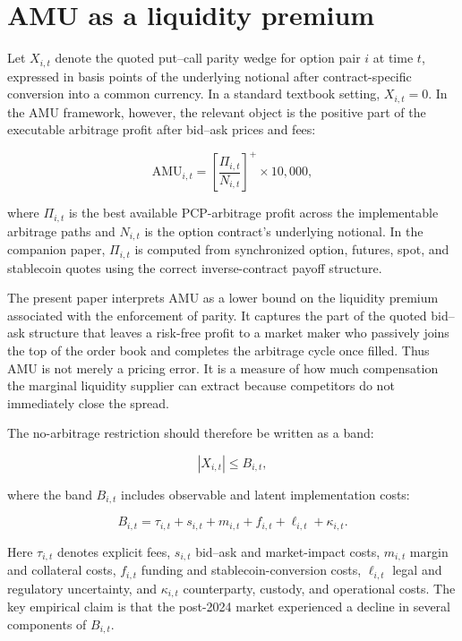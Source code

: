 \documentclass[12pt]{article}
\begin{document}
\section{AMU as a liquidity premium}

Let $X_{i,t}$ denote the quoted put--call parity wedge for option pair $i$ at time $t$, expressed in basis points of the underlying notional after contract-specific conversion into a common currency. In a standard textbook setting, $X_{i,t}=0$. In the AMU framework, however, the relevant object is the positive part of the executable arbitrage profit after bid--ask prices and fees:

\begin{equation}
\mathrm{AMU}_{i,t}=\left[\frac{\Pi_{i,t}}{N_{i,t}}\right]^+\times 10{,}000,
\end{equation}

where $\Pi_{i,t}$ is the best available PCP-arbitrage profit across the implementable arbitrage paths and $N_{i,t}$ is the option contract's underlying notional. In the companion paper, $\Pi_{i,t}$ is computed from synchronized option, futures, spot, and stablecoin quotes using the correct inverse-contract payoff structure.

The present paper interprets AMU as a lower bound on the liquidity premium associated with the enforcement of parity. It captures the part of the quoted bid--ask structure that leaves a risk-free profit to a market maker who passively joins the top of the order book and completes the arbitrage cycle once filled. Thus AMU is not merely a pricing error. It is a measure of how much compensation the marginal liquidity supplier can extract because competitors do not immediately close the spread.

The no-arbitrage restriction should therefore be written as a band:

\begin{equation}
|X_{i,t}| \leq B_{i,t},
\end{equation}

where the band $B_{i,t}$ includes observable and latent implementation costs:

\begin{equation}
B_{i,t}=\tau_{i,t}+s_{i,t}+m_{i,t}+f_{i,t}+\ell_{i,t}+\kappa_{i,t}.
\end{equation}

Here $\tau_{i,t}$ denotes explicit fees, $s_{i,t}$ bid--ask and market-impact costs, $m_{i,t}$ margin and collateral costs, $f_{i,t}$ funding and stablecoin-conversion costs, $\ell_{i,t}$ legal and regulatory uncertainty, and $\kappa_{i,t}$ counterparty, custody, and operational costs. The key empirical claim is that the post-2024 market experienced a decline in several components of $B_{i,t}$.
\end{document}
